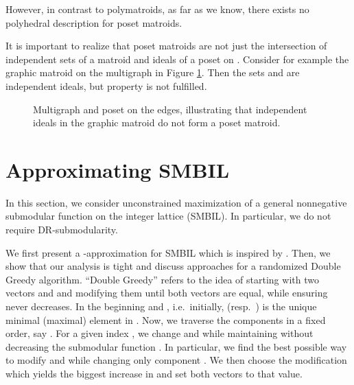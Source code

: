 \documentclass{article}
\theoremstyle{plain}
\theoremstyle{definition}
\begin{document}
However, in contrast to polymatroids, as far as we know, there exists no polyhedral description for poset matroids.


It is important to realize that poset matroids are not just the intersection of independent sets of a matroid   and ideals of a poset on .
Consider for example the graphic matroid on the multigraph in Figure \ref{fig:posetMatroidDifference}.
Then the sets  and  are independent ideals,
but property  is not fulfilled.


\begin{figure}[tb]
\centering
{}
\caption{Multigraph and poset on the edges, illustrating that independent ideals in the graphic matroid do not form a poset matroid.}\label{fig:posetMatroidDifference}
\end{figure}






\section{Approximating SMBIL}\label{sec:SMBIL-Algo}
In this section, we consider unconstrained maximization of a general nonnegative submodular function on the integer lattice (SMBIL). In particular, 
we do not require DR-submodularity. 

We first present a -approximation for SMBIL which is inspired by \cite{DoubleGreedy}. 
Then, we show that our analysis is tight and discuss approaches for a randomized Double Greedy algorithm. 
``Double Greedy'' refers to the idea of starting with two vectors  and  and modifying them until both vectors are equal,
 while ensuring  never decreases.
In the beginning  and , i.e.\ initially,  (resp.\ ) is the unique minimal (maximal) element
in . 
Now, we traverse the components in a fixed order, say . For a given index , we change  and  
while maintaining  without decreasing the submodular function .
In particular, we find the best possible way to modify  and  while changing only component . We then choose the modification which yields
the biggest increase in  and set both vectors to that value. 
\end{document}
